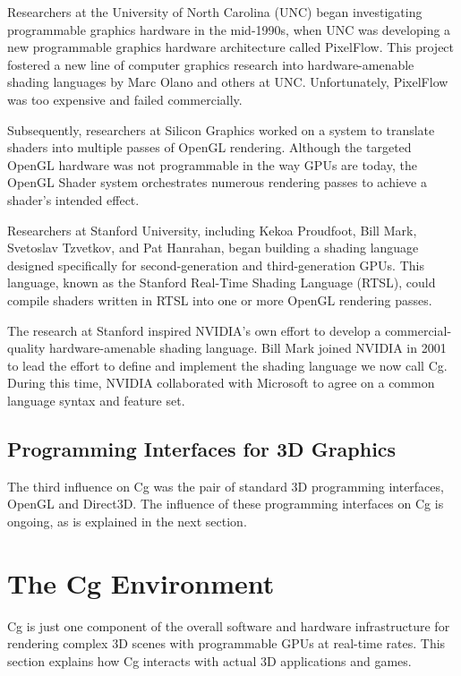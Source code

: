 \documentclass[../main.tex]{subfiles}
\begin{document}
Researchers at the University of North Carolina (UNC) began investigating programmable graphics hardware in the mid-1990s, when UNC was developing a new programmable graphics hardware architecture called PixelFlow. This project fostered a new line of computer graphics research into hardware-amenable shading languages by Marc Olano and others at UNC. Unfortunately, PixelFlow was too expensive and failed commercially.

Subsequently, researchers at Silicon Graphics worked on a system to translate shaders into multiple passes of OpenGL rendering. Although the targeted OpenGL hardware was not programmable in the way GPUs are today, the OpenGL Shader system orchestrates numerous rendering passes to achieve a shader's intended effect.

Researchers at Stanford University, including Kekoa Proudfoot, Bill Mark, Svetoslav Tzvetkov, and Pat Hanrahan, began building a shading language designed specifically for second-generation and third-generation GPUs. This language, known as the Stanford Real-Time Shading Language (RTSL), could compile shaders written in RTSL into one or more OpenGL rendering passes.

The research at Stanford inspired NVIDIA's own effort to develop a commercial-quality hardware-amenable shading language. Bill Mark joined NVIDIA in 2001 to lead the effort to define and implement the shading language we now call Cg. During this time, NVIDIA collaborated with Microsoft to agree on a common language syntax and feature set.

\subsection{Programming Interfaces for 3D Graphics}

The third influence on Cg was the pair of standard 3D programming interfaces, OpenGL and Direct3D. The influence of these programming interfaces on Cg is ongoing, as is explained in the next section.

\section{The Cg Environment}

Cg is just one component of the overall software and hardware infrastructure for rendering complex 3D scenes with programmable GPUs at real-time rates. This section explains how Cg interacts with actual 3D applications and games.
\end{document}
